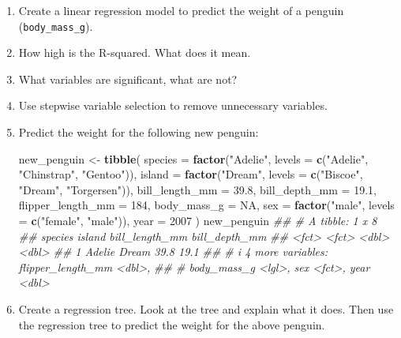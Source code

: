 \documentclass[
  notitlepage]{book}
\newenvironment{Shaded}{\begin{snugshade}}{\end{snugshade}}
\newcommand{\CommentTok}[1]{\textcolor[rgb]{0.56,0.35,0.01}{\textit{#1}}}
\newcommand{\DataTypeTok}[1]{\textcolor[rgb]{0.13,0.29,0.53}{#1}}
\newcommand{\DecValTok}[1]{\textcolor[rgb]{0.00,0.00,0.81}{#1}}
\newcommand{\FloatTok}[1]{\textcolor[rgb]{0.00,0.00,0.81}{#1}}
\newcommand{\KeywordTok}[1]{\textcolor[rgb]{0.13,0.29,0.53}{\textbf{#1}}}
\newcommand{\NormalTok}[1]{#1}
\newcommand{\OtherTok}[1]{\textcolor[rgb]{0.56,0.35,0.01}{#1}}
\newcommand{\StringTok}[1]{\textcolor[rgb]{0.31,0.60,0.02}{#1}}
\begin{document}
\begin{enumerate}
\def\labelenumi{\arabic{enumi}.}
\item
  Create a linear regression model to predict the weight
  of a penguin (\texttt{body\_mass\_g}).
\item
  How high is the R-squared. What does it mean.
\item
  What variables are significant, what are not?
\item
  Use stepwise variable selection to remove unnecessary variables.
\item
  Predict the weight for the following new penguin:

\begin{Shaded}
\begin{Highlighting}[]
\NormalTok{new\_penguin \textless{}{-}}\StringTok{ }\KeywordTok{tibble}\NormalTok{(}
  \DataTypeTok{species =} \KeywordTok{factor}\NormalTok{(}\StringTok{"Adelie"}\NormalTok{, }
    \DataTypeTok{levels =} \KeywordTok{c}\NormalTok{(}\StringTok{"Adelie"}\NormalTok{, }\StringTok{"Chinstrap"}\NormalTok{, }\StringTok{"Gentoo"}\NormalTok{)),}
  \DataTypeTok{island =} \KeywordTok{factor}\NormalTok{(}\StringTok{"Dream"}\NormalTok{, }
    \DataTypeTok{levels =} \KeywordTok{c}\NormalTok{(}\StringTok{"Biscoe"}\NormalTok{, }\StringTok{"Dream"}\NormalTok{, }\StringTok{"Torgersen"}\NormalTok{)),}
 \DataTypeTok{bill\_length\_mm =} \FloatTok{39.8}\NormalTok{, }
 \DataTypeTok{bill\_depth\_mm =} \FloatTok{19.1}\NormalTok{, }
 \DataTypeTok{flipper\_length\_mm =} \DecValTok{184}\NormalTok{, }
 \DataTypeTok{body\_mass\_g =} \OtherTok{NA}\NormalTok{, }
 \DataTypeTok{sex =} \KeywordTok{factor}\NormalTok{(}\StringTok{"male"}\NormalTok{, }\DataTypeTok{levels =} \KeywordTok{c}\NormalTok{(}\StringTok{"female"}\NormalTok{, }\StringTok{"male"}\NormalTok{)), }
 \DataTypeTok{year =} \DecValTok{2007}
\NormalTok{) }
\NormalTok{new\_penguin}
\CommentTok{\#\# \# A tibble: 1 x 8}
\CommentTok{\#\#   species island bill\_length\_mm bill\_depth\_mm}
\CommentTok{\#\#   \textless{}fct\textgreater{}   \textless{}fct\textgreater{}           \textless{}dbl\textgreater{}         \textless{}dbl\textgreater{}}
\CommentTok{\#\# 1 Adelie  Dream            39.8          19.1}
\CommentTok{\#\# \# i 4 more variables: flipper\_length\_mm \textless{}dbl\textgreater{},}
\CommentTok{\#\# \#   body\_mass\_g \textless{}lgl\textgreater{}, sex \textless{}fct\textgreater{}, year \textless{}dbl\textgreater{}}
\end{Highlighting}
\end{Shaded}
\item
  Create a regression tree. Look at the tree and explain what it does.
  Then use the regression tree to predict the weight for the above penguin.
\end{enumerate}
\end{document}
